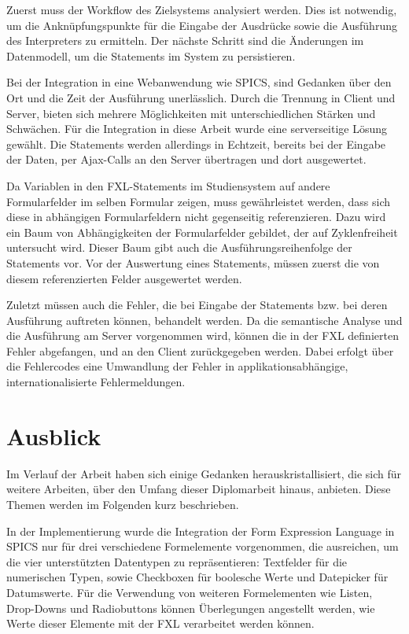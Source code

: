 Zuerst muss der Workflow des Zielsystems analysiert werden. Dies ist notwendig, um die Anknüpfungspunkte für die Eingabe der Ausdrücke sowie die Ausführung des Interpreters zu ermitteln. Der nächste Schritt sind die Änderungen im Datenmodell, um die Statements im System zu persistieren.

Bei der Integration in eine Webanwendung wie SPICS, sind Gedanken über den Ort und die Zeit der Ausführung unerlässlich. Durch die Trennung in Client und Server, bieten sich mehrere Möglichkeiten mit unterschiedlichen Stärken und Schwächen. Für die Integration in diese Arbeit wurde eine serverseitige Lösung gewählt. Die Statements werden allerdings in Echtzeit, bereits bei der Eingabe der Daten, per Ajax-Calls an den Server übertragen und dort ausgewertet.

Da Variablen in den FXL-Statements im Studiensystem auf andere Formularfelder im selben Formular zeigen, muss gewährleistet werden, dass sich diese in abhängigen Formularfeldern nicht gegenseitig referenzieren. Dazu wird ein Baum von Abhängigkeiten der Formularfelder gebildet, der auf Zyklenfreiheit untersucht wird. Dieser Baum gibt auch die Ausführungsreihenfolge der Statements vor. Vor der Auswertung eines Statements, müssen zuerst die von diesem referenzierten Felder ausgewertet werden.

Zuletzt müssen auch die Fehler, die bei Eingabe der Statements bzw. bei deren Ausführung auftreten können, behandelt werden. Da die semantische Analyse und die Ausführung am Server vorgenommen wird, können die in der FXL definierten Fehler abgefangen, und an den Client zurückgegeben werden. Dabei erfolgt über die Fehlercodes eine Umwandlung der Fehler in applikationsabhängige, internationalisierte Fehlermeldungen.



\chapter{Ausblick}
\label{chapter_ausblick}

Im Verlauf der Arbeit haben sich einige Gedanken herauskristallisiert, die sich für weitere Arbeiten, über den Umfang dieser Diplomarbeit hinaus, anbieten. Diese  Themen werden im Folgenden kurz beschrieben. 

In der Implementierung wurde die Integration der Form Expression Language in SPICS nur für drei verschiedene Formelemente vorgenommen, die ausreichen, um die vier unterstützten Datentypen zu repräsentieren: Textfelder für die numerischen Typen, sowie Checkboxen für boolesche Werte und Datepicker für Datumswerte. Für die Verwendung von weiteren Formelementen wie Listen, Drop-Downs und Radiobuttons können Überlegungen angestellt werden, wie Werte dieser Elemente mit der FXL verarbeitet werden können.

